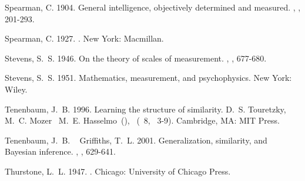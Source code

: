 \documentclass[11pt]{article}
\begin{document}
\begin{thebibliography}{}
%
%
Spearman, C.%
%
\newblock{}\BBOP{}1904\BBCP{}.
\newblock{}\BBOQ{}General intelligence, objectively determined and
  measured.\BBCQ{}
\newblock{}, , 201-293.

%
%
Spearman, C.%
%
\newblock{}\BBOP{}1927\BBCP{}.
\newblock{}.
\newblock{}New York: Macmillan.

%
%
Stevens, S.~S.%
%
\newblock{}\BBOP{}1946\BBCP{}.
\newblock{}\BBOQ{}On the theory of scales of measurement.\BBCQ{}
\newblock{}, , 677-680.

%
%
Stevens, S.~S.%
%
\newblock{}\BBOP{}1951\BBCP{}.
\newblock{}\BBOQ{}Mathematics, measurement, and psychophysics.\BBCQ{}
\newblock{}\BIn{} 
\newblock{}New York: Wiley.

%
%
Tenenbaum, J.~B.%
%
\newblock{}\BBOP{}1996\BBCP{}.
\newblock{}\BBOQ{}Learning the structure of similarity.\BBCQ{}
\newblock{}\BIn{} D.~S. Touretzky, M.~C. Mozer\BCBL{}\ \BBA{} M.~E. Hasselmo\
  (\BEDS), \
  (\BVOL~8, \BPG\ 3-9).
\newblock{}Cambridge, MA: MIT Press.

%
%
Tenenbaum, J.~B.%
\BCBT{}\ \BBA{} Griffiths, T.~L.%
%
\newblock{}\BBOP{}2001\BBCP{}.
\newblock{}\BBOQ{}Generalization, similarity, and {B}ayesian inference.\BBCQ{}
\newblock{}, , 629-641.

%
%
Thurstone, L.~L.%
%
\newblock{}\BBOP{}1947\BBCP{}.
\newblock{}.
\newblock{}Chicago: University of Chicago Press.


\end{thebibliography}
\end{document}
